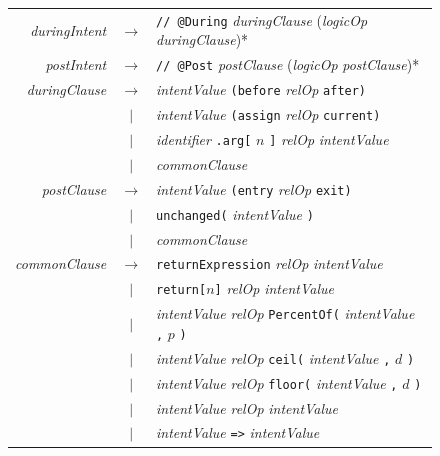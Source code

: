 \documentclass[pdflatex,sn-basic]{sn-jnl}%
\theoremstyle{thmstyleone}%
\theoremstyle{thmstyletwo}%
\theoremstyle{thmstylethree}%
\begin{document}
\begin{figure}[t]
\centering
\small
\begin{tabular}{@{}r@{\quad}c@{\quad}l@{}}
\textit{duringIntent} & $\rightarrow$ & \texttt{// @During} \textit{duringClause} (\textit{logicOp} \textit{duringClause})* \\[2pt]
\textit{postIntent} & $\rightarrow$ & \texttt{// @Post} \textit{postClause} (\textit{logicOp} \textit{postClause})* \\[6pt]

\textit{duringClause} & $\rightarrow$ & \textit{intentValue} \texttt{(before} \textit{relOp} \texttt{after)} \\
& $|$ & \textit{intentValue} \texttt{(assign} \textit{relOp} \texttt{current)} \\
& $|$ & \textit{identifier} \texttt{.arg[} $n$ \texttt{]} \textit{relOp} \textit{intentValue} \\
& $|$ & \textit{commonClause} \\[6pt]

\textit{postClause} & $\rightarrow$ & \textit{intentValue} \texttt{(entry} \textit{relOp} \texttt{exit)} \\
& $|$ & \texttt{unchanged(} \textit{intentValue} \texttt{)} \\
& $|$ & \textit{commonClause} \\[6pt]

\textit{commonClause} & $\rightarrow$ & \texttt{returnExpression} \textit{relOp} \textit{intentValue} \\
& $|$ & \texttt{return[}$n$\texttt{]} \textit{relOp} \textit{intentValue} \\
& $|$ & \textit{intentValue} \textit{relOp} \texttt{PercentOf(} \textit{intentValue} \texttt{,} $p$ \texttt{)} \\
& $|$ & \textit{intentValue} \textit{relOp} \texttt{ceil(} \textit{intentValue} \texttt{,} $d$ \texttt{)} \\
& $|$ & \textit{intentValue} \textit{relOp} \texttt{floor(} \textit{intentValue} \texttt{,} $d$ \texttt{)} \\
& $|$ & \textit{intentValue} \textit{relOp} \textit{intentValue} \\
& $|$ & \textit{intentValue} \texttt{=>} \textit{intentValue} \\[6pt]


\end{tabular}
\end{figure}
\end{document}
